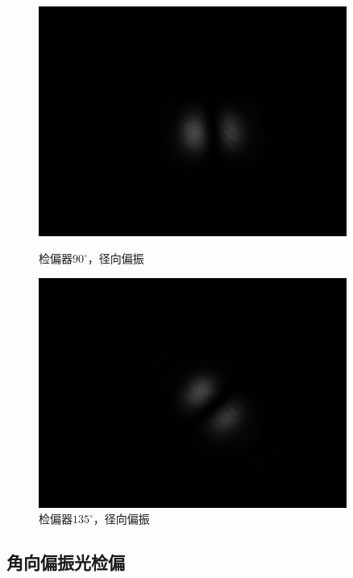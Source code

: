 \documentclass[a4paper,UTF8]{ctexart}
\begin{document}
\begin{figure}[H]
    \centering
    \begin{minipage}[b]{0.45\textwidth}
        \centering
        \includegraphics[width=0.9\textwidth]{./fig/1_3.png}
        \caption{检偏器$90^{\circ}$，径向偏振}
    \end{minipage}
    \begin{minipage}[b]{0.45\textwidth}
        \centering
        \includegraphics[width=0.9\textwidth]{./fig/1_2.png}
        \caption{检偏器$135^{\circ}$，径向偏振}
    \end{minipage}
\end{figure}

\subsection{角向偏振光检偏}
\end{document}
